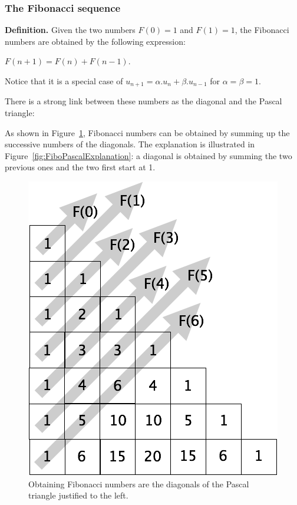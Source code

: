 \subsubsection{The Fibonacci sequence}




\bigskip

\noindent
{\bf Definition.}
Given the two numbers $F(0) = 1$ and $F(1) = 1$, 
the Fibonacci numbers are obtained by the following expression: 

$F(n+1)= F(n)+F(n-1)$.
\bigskip



Notice that it is a special case of $u_{n+1} =\alpha.u_{n} + \beta.u_{n-1}$ for $\alpha=\beta=1$.
\bigskip

There is a strong link between these numbers as the diagonal and the Pascal triangle:

As shown in Figure~\ref{fig:FiboPascal}, Fibonacci numbers can be obtained by summing up the successive numbers of the diagonals.
The explanation is illustrated in Figure~\ref{fig:FiboPascalExplanation}: a diagonal is obtained by summing the two previous ones and the two first start at 1. 

\begin{figure}[h]
\begin{center}
        \includegraphics[scale=0.4]{FiguresMaths//FiboPascal1}
        \caption{Obtaining Fibonacci numbers are the diagonals of the Pascal triangle justified to the left. }
        \label{fig:FiboPascal}
\end{center}
\end{figure}

